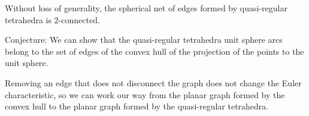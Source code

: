 \documentclass[cup9a]{cupbook}
\begin{document}
	Without loss of generality, the spherical net of edges formed by quasi-regular tetrahedra is 2-connected.  
    
    Conjecture: We can show that the quasi-regular tetrahedra unit sphere arcs belong to the set of edges of the convex hull of the projection of the points to the unit sphere.  
    
    Removing an edge that does not disconnect the graph does not change the Euler characteristic, so we can work our way from the planar graph formed by the convex hull to the planar graph formed by the quasi-regular tetrahedra.


    


 
    
\end{document}
